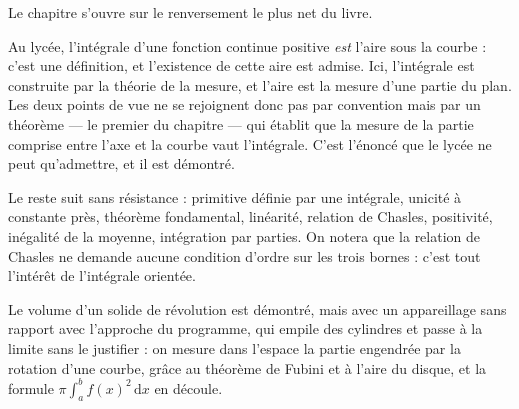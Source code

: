 Le chapitre s'ouvre sur le renversement le plus net du livre.

Au lycée, l'intégrale d'une fonction continue positive \emph{est} l'aire sous la courbe :
c'est une définition, et l'existence de cette aire est admise. Ici, l'intégrale est
construite par la théorie de la mesure, et l'aire est la mesure d'une partie du plan. Les deux
points de vue ne se rejoignent donc pas par convention mais par un théorème — le premier du
chapitre — qui établit que la mesure de la partie comprise entre l'axe et la courbe vaut
l'intégrale. C'est l'énoncé que le lycée ne peut qu'admettre, et il est démontré.

Le reste suit sans résistance : primitive définie par une intégrale, unicité à constante près,
théorème fondamental, linéarité, relation de Chasles, positivité, inégalité de la moyenne,
intégration par parties. On notera que la relation de Chasles ne demande aucune condition
d'ordre sur les trois bornes : c'est tout l'intérêt de l'intégrale orientée.

Le volume d'un solide de révolution est démontré, mais avec un appareillage sans rapport avec
l'approche du programme, qui empile des cylindres et passe à la limite sans le justifier :
on mesure dans l'espace la partie engendrée par la rotation d'une courbe, grâce au théorème
de Fubini et à l'aire du disque, et la formule $\pi \int_a^b f(x)^2\,\mathrm{d}x$ en découle.
